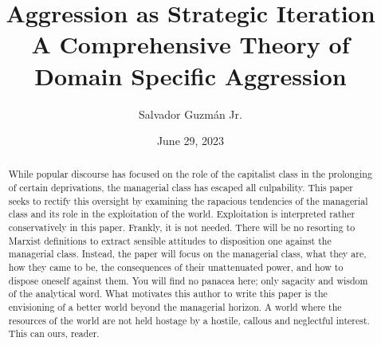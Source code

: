 \documentclass[12pt]{article}
\title{
 Aggression as Strategic Iteration \\
 \large A Comprehensive Theory of Domain Specific Aggression }
\author{Salvador Guzm\'an Jr.}
\date{June 29, 2023}
\begin{document}
\maketitle
\pagebreak

\begin{abstract}
    While popular discourse has focused on the role of the capitalist class in the prolonging of certain deprivations, the managerial class has escaped all culpability.
    This paper seeks to rectify this oversight by examining the rapacious tendencies of the managerial class and its role in the exploitation of the world.
    Exploitation is interpreted rather conservatively in this paper.
    Frankly, it is not needed.
    There will be no resorting to Marxist definitions to extract sensible attitudes to disposition one against the managerial class. Instead, the paper will focus on the managerial class, what they are, how they came to be, the consequences of their unattenuated power, and how to dispose oneself against them.
    You will find no panacea here; only sagacity and wisdom of the analytical word. What motivates this author to write this paper is the envisioning of a better world beyond the managerial horizon.
    A world where the resources of the world are not held hostage by a hostile, callous and neglectful interest.
    This can ours, reader.
\end{abstract}
\pagebreak
\tableofcontents
\pagebreak
\end{document}
